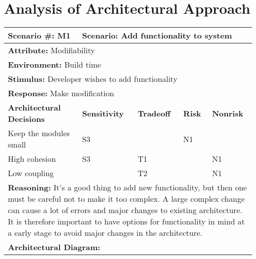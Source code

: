 \section{Analysis of Architectural Approach}

\begin{tabular}{|m{}|m{}|m{}
|m{}|m{}|m{}|}
  \hline
  {\bf Scenario \#:} M1 & \multicolumn{5}{m{0.75 \textwidth}|}{{\bf Scenario:}
  Add functionality to system} \\ \hline
  \multicolumn{6}{|m{0.9 \textwidth}|}{{\bf Attribute:} Modifiability}
  \\ \hline
  \multicolumn{6}{|m{0.9 \textwidth}|}{{\bf Environment:} Build time} \\ \hline
  \multicolumn{6}{|m{0.9 \textwidth}|}{{\bf Stimulus:} Developer wishes to add
  functionality} \\ \hline
  \multicolumn{6}{|m{0.9 \textwidth}|}{{\bf Response:} Make modification}
  \\ \hline
  \multicolumn{2}{|m{0.3 \textwidth}|}{\bf Architectural Decisions} &
  {\bf Sensitivity} & {\bf Tradeoff} & {\bf Risk} & {\bf Nonrisk} \\ \hline
  \multicolumn{2}{|m{0.3 \textwidth}|}{Keep the modules small} & S3 &  & N1 &
  \\ \hline
  \multicolumn{2}{|m{0.3 \textwidth}|}{High cohesion} & S3 & T1 &  & N1
  \\ \hline
  \multicolumn{2}{|m{0.3 \textwidth}|}{Low coupling} &  & T2 &  & N1 \\ \hline
  \multicolumn{6}{|m{0.9 \textwidth}|}{{\bf Reasoning:} It's a good thing to
  add new functionality, but then one must be careful not to make it too
  complex. A large complex change can cause a lot of errors and major changes
  to existing architecture. It is therefore important to have options for
  functionality in mind at a early stage to avoid major changes in the
  architecture.} \\ \hline
  \multicolumn{6}{|m{0.9 \textwidth}|}{{\bf Architectural Diagram:} } \\ \hline
\end{tabular}

